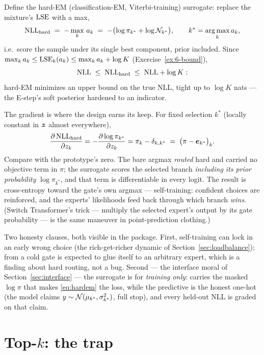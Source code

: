 Define the hard-EM (classification-EM, Viterbi-training) surrogate:
replace the mixture's $\operatorname{LSE}$ with a max,
\begin{equation}\label{eq:hardem}
  \mathrm{NLL}_{\mathrm{hard}} \;=\; -\max_k\, a_k
  \;=\; -\bigl(\log \pi_{k^\ast} + \log \mathcal{N}_{k^\ast}\bigr),
  \qquad k^\ast = \operatorname*{arg\,max}_k a_k,
\end{equation}
i.e.\ score the sample under its single best component, prior included.
Since $\max_k a_k \le \operatorname{LSE}_k(a_k) \le \max_k a_k + \log K$
(Exercise~\ref{ex:6-bound}),
\[
  \mathrm{NLL} \;\le\; \mathrm{NLL}_{\mathrm{hard}} \;\le\; \mathrm{NLL} + \log K:
\]
hard-EM minimizes an upper bound on the true NLL, tight up to $\log K$
nats --- the E-step's soft posterior hardened to an indicator.

The gradient is where the design earns its keep. For fixed selection
$k^\ast$ (locally constant in $\bm{z}$ almost everywhere),
\begin{equation}\label{eq:hardgrad}
  \frac{\partial\, \mathrm{NLL}_{\mathrm{hard}}}{\partial z_k}
  = -\frac{\partial \log \pi_{k^\ast}}{\partial z_k}
  = \pi_k - \delta_{k, k^\ast}
  \;=\; \bigl(\pi - \bm{e}_{k^\ast}\bigr)_k .
\end{equation}
Compare with the prototype's zero. The bare argmax \emph{routed} hard and
carried no objective term in $\pi$; the surrogate scores the selected
branch \emph{including its prior probability} $\log \pi_{k^\ast}$, and
that term is differentiable in every logit. The result is cross-entropy
toward the gate's own argmax --- self-training: confident choices are
reinforced, and the experts' likelihoods feed back through which branch
\emph{wins}. (Switch Transformer's trick --- multiply the selected
expert's output by its gate probability --- is the same maneuver in
point-prediction clothing.)

Two honesty clauses, both visible in the package. First, self-training
can lock in an early wrong choice (the rich-get-richer dynamic of
Section~\ref{sec:loadbalance});  from a cold gate is expected
to glue itself to an arbitrary expert, which is a finding about hard
routing, not a bug. Second --- the interface moral of
Section~\ref{sec:interface} --- the surrogate is for \emph{training
only}:  carries the masked
$\log\pi$ that makes \eqref{eq:hardem} the loss, while the predictive
 is the honest one-hot (the model claims
$y \sim \mathcal{N}(\mu_{k^\ast}, \sigma_{k^\ast}^2)$, full stop), and every
held-out NLL is graded on that claim.

\section{Top-$k$: the trap}\label{sec:topk}

